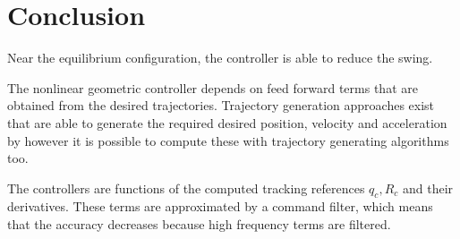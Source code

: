 \newpage
\section{Conclusion}\label{set:set.con}

Near the equilibrium configuration, the  controller is able to reduce the swing.

The nonlinear geometric controller depends on feed forward terms that are obtained from the desired trajectories. 
Trajectory generation approaches exist that are able to generate the required desired position, velocity and acceleration by 
however it is possible to compute these with trajectory generating algorithms too.

The controllers are functions of the computed tracking references $ q_c, R_c $ and their derivatives. These terms are approximated by a command filter, which means that the accuracy decreases because high frequency terms are filtered.